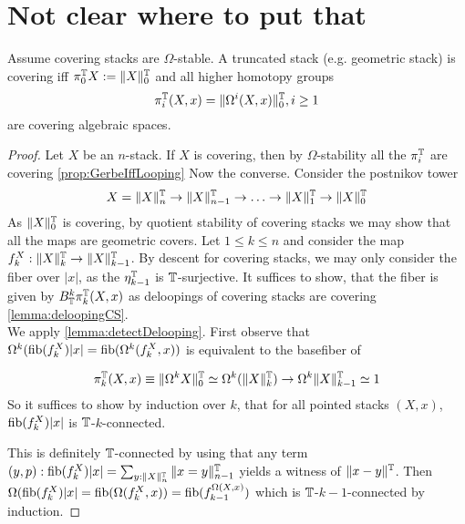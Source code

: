 \documentclass{article}
\begin{document}


\section{Not clear where to put that}
\begin{prop}{\label{prop:htpyGroups}}
	Assume covering stacks are $\Omega$-stable.
	A truncated stack (e.g. geometric stack) is covering iff $\pi_0^{\mathbb{T}} X := \|X\|_0^{\mathbb{T}}$ and all higher homotopy groups 
	\[
	\pi_i^{\mathbb{T}}(X,x) = \|\Omega^i (X , x)\|_0^{\mathbb{T}} , i \ge 1
	\]
	are covering algebraic spaces.
\end{prop}
\begin{proof}
	Let $X$ be an $n$-stack.
	If $X$ is covering, then by $\Omega$-stability all the $\pi_i^{\mathbb{T}}$ are covering \ref{prop:GerbeIffLooping} Now the converse.
	Consider the postnikov tower
	\[
	X = \|X\|_n^{\mathbb{T}} \to \|X\|_{n-1}^{\mathbb{T}} \to \hdots \to \|X\|_1^{\mathbb{T}} \to \|X\|_0^{\mathbb{T}} 
	\]
	As $\|X\|_0^{\mathbb{T}}$ is covering, by quotient stability of covering stacks we may show that all the maps are geometric covers. 
	Let $1 \le k \le n$ and consider the map $f_k^X : \|X\|_{k}^{\mathbb{T}} \to \|X\|_{k-1}^{\mathbb{T}}$. By descent for covering stacks, we may only consider the fiber over $|x|$, as the $\eta_{k-1}^{\mathbb{T}}$ is $\mathbb{T}$-surjective. 
	It suffices to show, that the fiber is given by $B_{\mathbb{T}}^k \pi^{\mathbb{T}}_k(X,x)$ as deloopings of covering stacks are covering \ref{lemma:deloopingCS}.\\	
	We apply \ref{lemma:detectDelooping}.
	First observe that $\Omega^k (\operatorname{fib}(f_k^X) |x| = \operatorname{fib} (\Omega^k (f_k^X , x))$ is equivalent to the basefiber of
	
	\[
	\pi_k^{\mathbb{T}}(X,x) \equiv \|\Omega^k X \|_0^{\mathbb{T}} \simeq \Omega^k(\|X\|_k^{\mathbb{T}}) \to \Omega^k \|X\|_{k-1}^{\mathbb{T}} \simeq 1
	\]
	So it suffices to show by induction over $k$, that for all pointed stacks $(X,x)$, $\operatorname{fib}(f_k^X) |x|$ is $\mathbb{T}$-$k$-connected.

	This is definitely $\mathbb{T}$-connected by using that any term $(y, p) : \operatorname{fib}(f_k^X) |x| = \sum_{y : \|X\|_n^{\mathbb{T}}} \|x = y\|_{n-1}^{\mathbb{T}}$ yields a witness of $\|x - y\|^{\mathbb{T}}$. Then $\Omega (\operatorname{fib}(f_k^X) |x| = \operatorname{fib} (\Omega (f_k^X , x)) = \operatorname{fib} (f_{k-1}^{\Omega (X , x)})$ which is $\mathbb{T}$-$k-1$-connected by induction.
\end{proof}
\end{document}
